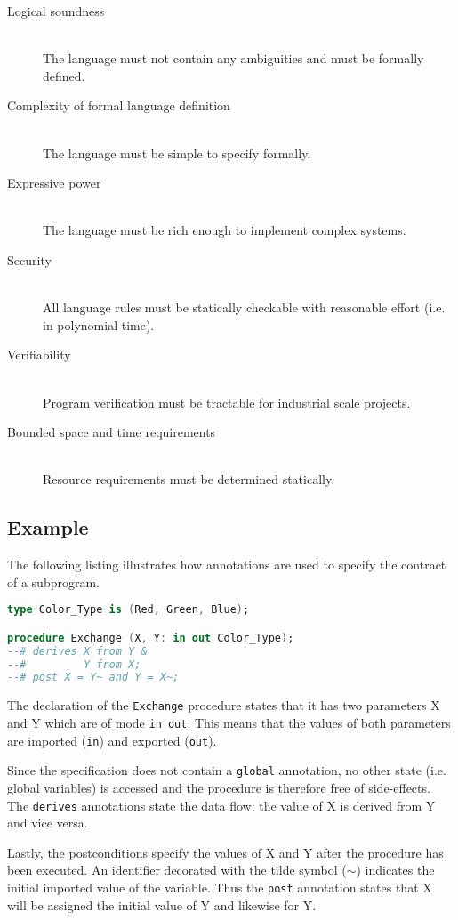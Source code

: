 \begin{description}
	\item[Logical soundness] \hfill \\
		The language must not contain any ambiguities and must be formally
		defined.
	\item[Complexity of formal language definition] \hfill \\
		The language must be simple to specify formally.
	\item[Expressive power] \hfill \\
		The language must be rich enough to implement complex systems.
	\item[Security] \hfill \\
		All language rules must be statically checkable with reasonable effort
		(i.e. in polynomial time).
	\item[Verifiability] \hfill \\
		Program verification must be tractable for industrial scale projects.
	\item[Bounded space and time requirements] \hfill \\
		Resource requirements must be determined statically.
\end{description}

\subsection{Example}
The following listing illustrates how annotations are used to specify the
contract of a subprogram.

\begin{lstlisting}[language=Ada]
type Color_Type is (Red, Green, Blue);

procedure Exchange (X, Y: in out Color_Type);
--# derives X from Y &
--#         Y from X;
--# post X = Y~ and Y = X~;
\end{lstlisting}

The declaration of the \texttt{Exchange} procedure states that it has two
parameters X and Y which are of mode \texttt{in out}. This means that the values
of both parameters are imported (\texttt{in}) and exported (\texttt{out}).

Since the specification does not contain a \texttt{global} annotation, no other
state (i.e. global variables) is accessed and the procedure is therefore free of
side-effects. The \texttt{derives} annotations state the data flow: the value of
X is derived from Y and vice versa.

Lastly, the postconditions specify the values of X and Y after the procedure
has been executed. An identifier decorated with the tilde symbol ($\sim$)
indicates the initial imported value of the variable. Thus the \texttt{post}
annotation states that X will be assigned the initial value of Y and likewise
for Y.

